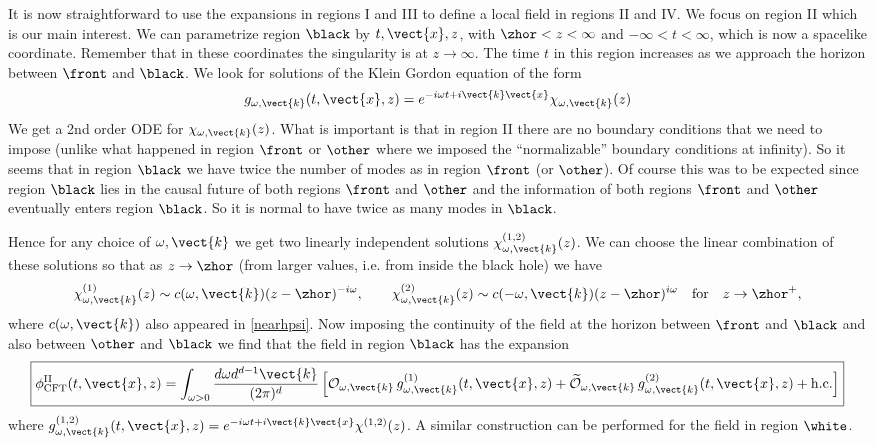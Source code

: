 It is now straightforward to use the expansions in regions I and III to define a local field in regions II and IV. We focus on region II which is our main interest.
We can parametrize region $\black$ by $t,\vect{x},z$, with $\zhor<z<\infty$ and $-\infty<t<\infty$, which is now a spacelike coordinate. Remember that in these coordinates the singularity is at $z\rightarrow \infty$. The time $t$ in this region increases as we approach the horizon between $\front$ and $\black$. 
We look for solutions of the Klein Gordon equation of the form 
\[
g_{\omega,\vect{k}}(t,\vect{x},z) = e^{-i\omega t+i\vect{k}\vect{x}} \chi_{\omega,\vect{k}}(z)
\]
We get a 2nd order ODE for $\chi_{\omega,\vect{k}}(z)$. What is important is that in region II there are no boundary conditions that we need to impose (unlike what happened in region $\front$ or $\other$ where we imposed the ``normalizable'' boundary conditions at infinity). So it seems that in region $\black$ we have twice the number of modes as in region $\front$ (or $\other$). Of course this was to be expected since region $\black$ lies in the causal future of both regions $\front$ and $\other$ and the information of both regions $\front$ and $\other$ eventually enters region $\black$. So it is normal to have twice as many modes in $\black$.


Hence for any choice of $\omega,\vect{k}$ we get two linearly independent solutions $\chi_{\omega,\vect{k}}^{(1,2)}(z)$. We can choose the linear combination of these solutions so that as $z\rightarrow \zhor$ (from larger values, i.e. from inside the black hole) we have
\[
\chi_{\omega,\vect{k}}^{(1)}(z) \sim c(\omega, \vect{k}) (z-\zhor)^{-i \omega},\qquad \chi_{\omega,\vect{k}}^{(2)}(z) \sim c(-\omega, \vect{k})(z-\zhor)^{i \omega}\quad {\rm for}\quad z\rightarrow \zhor^+,
\]
where $c(\omega, \vect{k})$ also appeared in \eqref{nearhpsi}. 
Now imposing the continuity of the field
at the horizon between $\front$ and $\black$ and also between $\other$ and $\black$ we find that the field in region $\black$ has the expansion
\begin{equation}
\boxed{\label{finalbehind}
\phi^{\rm II}_{\text{CFT}}(t,\vect{x},z) =
\int_{\omega>0} {d\omega d^{d-1}\vect{k}  \over (2 \pi)^d}\left[ {\cal O}_{\omega,\vect{k}}\, g_{\omega,\vect{k}}^{(1)}(t,\vect{x},z) + \widetilde{\cal O}_{\omega,\vect{k}} \,g_{\omega,\vect{k}}^{(2)}(t,\vect{x},z)+ {\rm h.c.}
\right]}
\end{equation}
where $g^{(1,2)}_{\omega,\vect{k}}(t,\vect{x},z) = e^{-i\omega t+i \vect{k}\vect{x}}\chi^{(1,2)}(z)$. A similar construction can be performed for the field in region $\white$.


